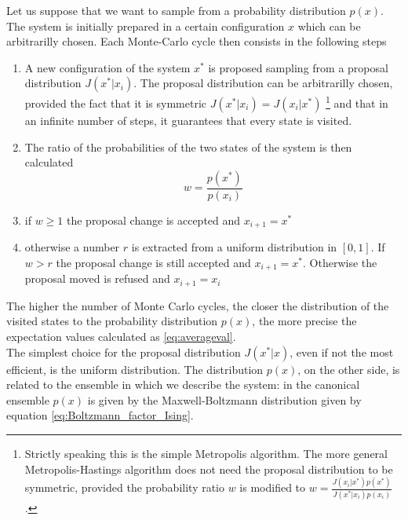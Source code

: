 \vspace{10pt}
Let us suppose that we want to sample from a probability distribution $p(x)$. \\
The system is initially prepared in a certain configuration $x$ which can be arbitrarilly chosen. Each Monte-Carlo cycle then consists in the following steps
\begin{enumerate}
    \item A new configuration of the system $x^*$ is proposed sampling from a proposal distribution $J(x^*|x_i)$. The proposal distribution can be arbitrarilly chosen, provided the fact that it is symmetric $J(x^*|x_i) = J(x_i|x^*)$
    \footnote{Strictly speaking this is the simple Metropolis algorithm. The more general Metropolis-Hastings algorithm does not need the proposal distribution to be symmetric, provided the probability ratio $w$ is modified to $w=\frac{J(x_i|x^*)p(x^*)}{J(x^*|x_i)p(x_i)}$.}
    and that in an infinite number of steps, it guarantees that every state is visited.
    \item The ratio of the probabilities of the two states of the system is then calculated
    \begin{equation*}
        w = \frac{p(x^*)}{p(x_i)}
    \end{equation*}
    \item if $w \geq 1$ the proposal change is accepted and $x_{i+1} = x^*$
    \item otherwise a number $r$ is extracted from a uniform distribution in $[0,1]$. If $w > r$ the proposal change is still accepted and $x_{i+1} = x^*$. Otherwise the proposal moved is refused and $x_{i+1} = x_i$
\end{enumerate}
The higher the number of Monte Carlo cycles, the closer the distribution of the visited states to the probability distribution $p(x)$, the more precise the expectation values calculated as \ref{eq:averageval}. \\
The simplest choice for the proposal distribution $J(x^*|x)$, even if not the most efficient, is the uniform distribution. The distribution $p(x)$, on the other side, is related to the ensemble 
in which we describe the system: in the canonical ensemble $p(x)$ is given by the Maxwell-Boltzmann distribution given by equation \ref{eq:Boltzmann_factor_Ising}.
\newpage

